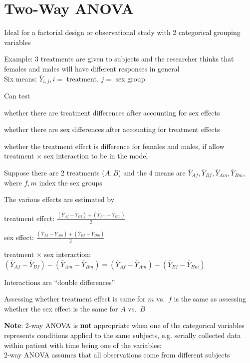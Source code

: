 \section{Two-Way ANOVA} 
\bi
\item Ideal for a factorial design or observational study with 2
  categorical grouping variables
\item Example: 3 treatments are given to subjects and the researcher
  thinks that females and males will have different responses in
  general \\
  Six means: $\bar{Y}_{i,j}, i=$ treatment, $j=$ sex group
\item Can test
 \bi
 \item whether there are treatment differences after
   accounting for sex effects
 \item whether there are sex differences after accounting for
   treatment effects
 \item whether the treatment effect is difference for females and
   males, if allow treatment $\times$ sex interaction to be in the
   model
 \ei
 \item Suppose there are 2 treatments ($A,B$) and the 4 means are
   $\bar{Y}_{Af}, \bar{Y}_{Bf}, \bar{Y}_{Am}, \bar{Y}_{Bm}$, where $f,
   m$ index the sex groups
 \item The various effects are estimated by
 \bi
 \item treatment effect: $\frac{(\bar{Y}_{Af}-\bar{Y}_{Bf})+(\bar{Y}_{Am}-\bar{Y}_{Bm})}{2}$
 \item sex effect: $\frac{(\bar{Y}_{Af}-\bar{Y}_{Am})+(\bar{Y}_{Bf}-\bar{Y}_{Bm})}{2}$
 \item treatment $\times$ sex interaction:
   $(\bar{Y}_{Af}-\bar{Y}_{Bf})-(\bar{Y}_{Am}-\bar{Y}_{Bm}) =
   (\bar{Y}_{Af}-\bar{Y}_{Am})-(\bar{Y}_{Bf}-\bar{Y}_{Bm})$
 \ei
\item Interactions are ``double differences''
\item Assessing whether treatment effect is same for $m$ vs.\ $f$ is
  the same as assessing whether the sex effect is the same for $A$
  vs.\ $B$
\item \textbf{Note}: 2-way ANOVA is \textbf{not} appropriate when one
  of the categorical variables represents conditions applied to the
  same subjects, e.g. serially collected data within patient with time
  being one of the variables; \\
  2-way ANOVA assumes that all observations come from different
  subjects
\ei

